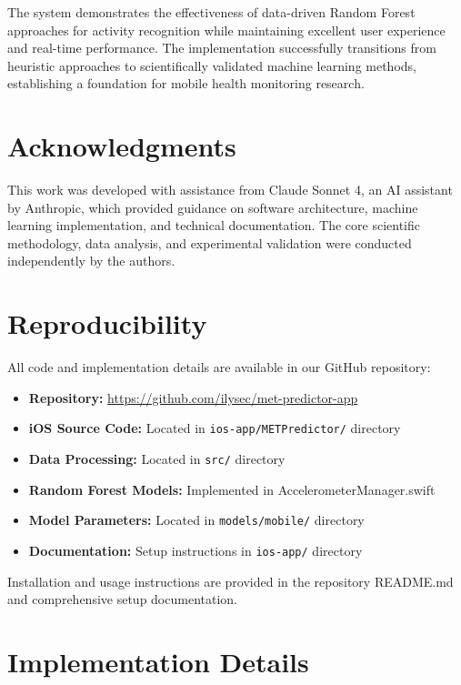 \documentclass[11pt,a4paper]{article}
\begin{document}
The system demonstrates the effectiveness of data-driven Random Forest approaches for activity recognition while maintaining excellent user experience and real-time performance. The implementation successfully transitions from heuristic approaches to scientifically validated machine learning methods, establishing a foundation for mobile health monitoring research.

\section{Acknowledgments}

This work was developed with assistance from Claude Sonnet 4, an AI assistant by Anthropic, which provided guidance on software architecture, machine learning implementation, and technical documentation. The core scientific methodology, data analysis, and experimental validation were conducted independently by the authors.

\section{Reproducibility}

All code and implementation details are available in our GitHub repository:

\begin{itemize}
    \item \textbf{Repository:} \url{https://github.com/ilysec/met-predictor-app}
    \item \textbf{iOS Source Code:} Located in \texttt{ios-app/METPredictor/} directory
    \item \textbf{Data Processing:} Located in \texttt{src/} directory
    \item \textbf{Random Forest Models:} Implemented in AccelerometerManager.swift
    \item \textbf{Model Parameters:} Located in \texttt{models/mobile/} directory
    \item \textbf{Documentation:} Setup instructions in \texttt{ios-app/} directory
\end{itemize}

Installation and usage instructions are provided in the repository README.md and comprehensive setup documentation.



 
\appendix

\section{Implementation Details}
\end{document}
